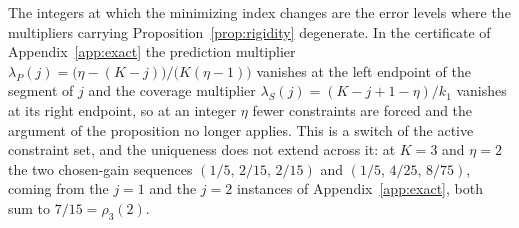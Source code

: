 \begin{remark}
\label{rem:rigidity-breakpoints}
The integers at which the minimizing index changes are the error levels where
the multipliers carrying Proposition~\ref{prop:rigidity} degenerate.  In the
certificate of Appendix~\ref{app:exact} the prediction multiplier
$\lambda_P(j)=\bigl(\eta-(K-j)\bigr)/\bigl(K(\eta-1)\bigr)$ vanishes at the
left endpoint of the segment of $j$ and the coverage multiplier
$\lambda_S(j)=(K-j+1-\eta)/k_1$ vanishes at its right endpoint, so at an
integer $\eta$ fewer constraints are forced and the argument of the
proposition no longer applies.  This is a switch of the active constraint set,
and the uniqueness does not extend across it: at $K=3$ and $\eta=2$ the two
chosen-gain sequences $(1/5,\,2/15,\,2/15)$ and $(1/5,\,4/25,\,8/75)$, coming
from the $j=1$ and the $j=2$ instances of Appendix~\ref{app:exact}, both sum
to $7/15=\rho_3(2)$.
\end{remark}

